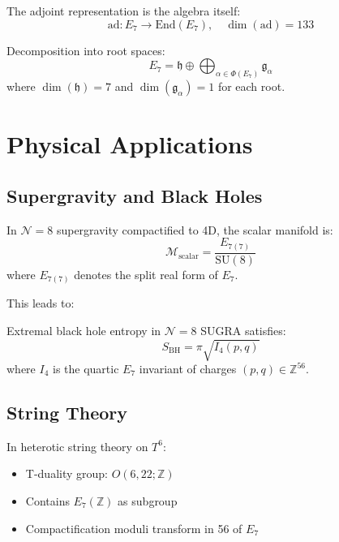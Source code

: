 The adjoint representation is the algebra itself:
\begin{equation}
\text{ad}: E_7 \to \text{End}(E_7), \quad \dim(\text{ad}) = 133
\end{equation}

Decomposition into root spaces:
\begin{equation}
E_7 = \mathfrak{h} \oplus \bigoplus_{\alpha \in \Phi(E_7)} \mathfrak{g}_\alpha
\end{equation}
where $\dim(\mathfrak{h}) = 7$ and $\dim(\mathfrak{g}_\alpha) = 1$ for each root.

\section{Physical Applications}

\subsection{Supergravity and Black Holes}

\begin{theorem}[E$_7$ in $\mathcal{N}=8$ SUGRA]
\label{thm:e7_sugra}
In $\mathcal{N}=8$ supergravity compactified to 4D, the scalar manifold is:
\begin{equation}
\mathcal{M}_{\text{scalar}} = \frac{E_{7(7)}}{\text{SU}(8)}
\end{equation}
where $E_{7(7)}$ denotes the split real form of $E_7$.
\end{theorem}

This leads to:

\begin{proposition}
\label{prop:bh_entropy_e7}
Extremal black hole entropy in $\mathcal{N}=8$ SUGRA satisfies:
\begin{equation}
S_{\text{BH}} = \pi \sqrt{I_4(p,q)}
\end{equation}
where $I_4$ is the quartic $E_7$ invariant of charges $(p,q) \in \mathbb{Z}^{56}$.
\end{proposition}

\subsection{String Theory}

In heterotic string theory on $T^6$:
\begin{itemize}
    \item T-duality group: $O(6,22;\mathbb{Z})$
    \item Contains $E_7(\mathbb{Z})$ as subgroup
    \item Compactification moduli transform in 56 of $E_7$
\end{itemize}

